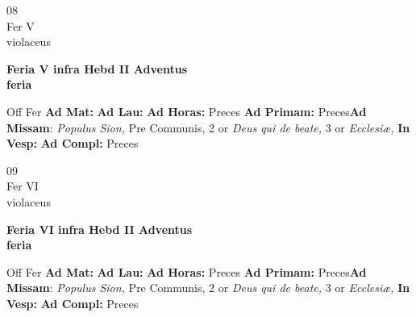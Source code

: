 \documentclass[10pt, openany]{book}
\begin{document}
    \begin{center}
        \begin{minipage}{3.5in}
            \vspace{2em}
            \begin{minipage}{0.5in}
                {\Huge 08} \\
                {\normalsize Fer V} \\
                {\normalsize violaceus}
            \end{minipage}
            \begin{minipage}{3.0in}
                \textbf{ \large Feria V infra Hebd II Adventus \\
                \textnormal{\normalsize feria}} \\ 
            \end{minipage}
            \begin{justify}Off Fer
                \textbf{Ad Mat: }
                \textbf{Ad Lau: }
                \textbf{Ad Horas: }Preces
                \textbf{Ad Primam: }Preces\textbf{Ad Missam}: \textit{Populus Sion,} Pre Communis, 2 or \textit{Deus qui de beate,} 3 or \textit{Ecclesiæ,}  
                \textbf{In Vesp: }
                \textbf{Ad Compl: }Preces
            \end{justify}
        \end{minipage}
    \end{center}

    \begin{center}
        \begin{minipage}{3.5in}
            \vspace{2em}
            \begin{minipage}{0.5in}
                {\Huge 09} \\
                {\normalsize Fer VI} \\
                {\normalsize violaceus}
            \end{minipage}
            \begin{minipage}{3.0in}
                \textbf{ \large Feria VI infra Hebd II Adventus \\
                \textnormal{\normalsize feria}} \\ 
            \end{minipage}
            \begin{justify}Off Fer
                \textbf{Ad Mat: }
                \textbf{Ad Lau: }
                \textbf{Ad Horas: }Preces
                \textbf{Ad Primam: }Preces\textbf{Ad Missam}: \textit{Populus Sion,} Pre Communis, 2 or \textit{Deus qui de beate,} 3 or \textit{Ecclesiæ,}  
                \textbf{In Vesp: }
                \textbf{Ad Compl: }Preces
            \end{justify}
        \end{minipage}
    \end{center}
\end{document}

